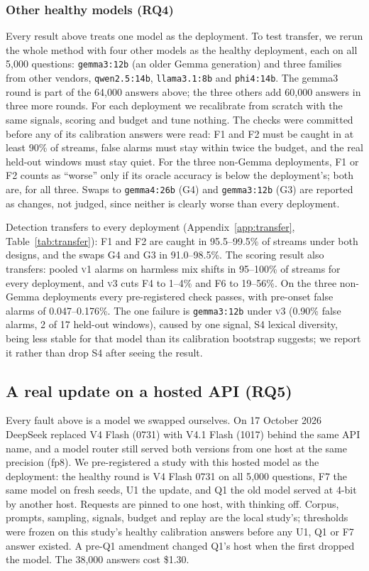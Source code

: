 \documentclass{article}
\newcommand{\vone}{\textsc{v1}}
\newcommand{\vthree}{\textsc{v3}}
\begin{document}
\subsubsection{Other healthy models (RQ4)}
\label{sec:transfer}
Every result above treats one model as the deployment. To test transfer, we
rerun the whole method with four other models as the healthy deployment, each on
all 5{,}000 questions: \texttt{gemma3:12b} (an older Gemma generation) and three
families from other vendors, \texttt{qwen2.5:14b}, \texttt{llama3.1:8b} and
\texttt{phi4:14b}. The gemma3 round is part of the 64{,}000 answers above; the
three others add 60{,}000 answers in three more rounds. For each deployment
we recalibrate from scratch with the same signals, scoring and budget and tune
nothing. The checks were committed before any of its calibration answers were
read: F1 and F2 must be caught in at least 90\% of streams, false alarms must stay
within twice the budget, and the real held-out windows must stay quiet. For the
three non-Gemma deployments, F1 or F2 counts as ``worse'' only if its oracle
accuracy is below the deployment's; both are, for all three. Swaps to
\texttt{gemma4:26b} (G4) and \texttt{gemma3:12b} (G3) are reported as changes,
not judged, since neither is clearly worse than every deployment.

Detection transfers to every deployment (Appendix~\ref{app:transfer},
Table~\ref{tab:transfer}): F1 and F2 are caught in 95.5--99.5\% of streams under
both designs, and the swaps G4 and G3 in 91.0--98.5\%. The scoring result also
transfers: pooled \vone{} alarms on harmless mix shifts in 95--100\% of streams for
every deployment, and \vthree{} cuts F4 to 1--4\% and F6 to 19--56\%. On the three
non-Gemma deployments every pre-registered check passes, with pre-onset false alarms
of 0.047--0.176\%. The one failure is \texttt{gemma3:12b} under \vthree{} (0.90\%
false alarms, 2 of 17 held-out windows), caused by one signal, S4 lexical diversity,
being less stable for that model than its calibration bootstrap suggests; we report
it rather than drop S4 after seeing the result.

\subsection{A real update on a hosted API (RQ5)}
\label{app:fixed-api}
Every fault above is a model we swapped ourselves. On 17 October 2026 DeepSeek
replaced V4 Flash (0731) with V4.1 Flash (1017) behind the same API name, and a
model router still served both versions from one host at the same precision
(fp8). We pre-registered a study with this hosted model as the deployment: the
healthy round is V4 Flash 0731 on all 5{,}000 questions, F7 the same model on fresh
seeds, U1 the update, and Q1 the old model served at 4-bit by another host.
Requests are pinned to one host, with thinking off. Corpus, prompts, sampling, signals, budget
and replay are the local study's; thresholds were frozen on this study's healthy
calibration answers before any U1, Q1 or F7 answer existed. A pre-Q1 amendment changed Q1's host when the first dropped the model. The
38{,}000 answers cost \$1.30.
\end{document}
